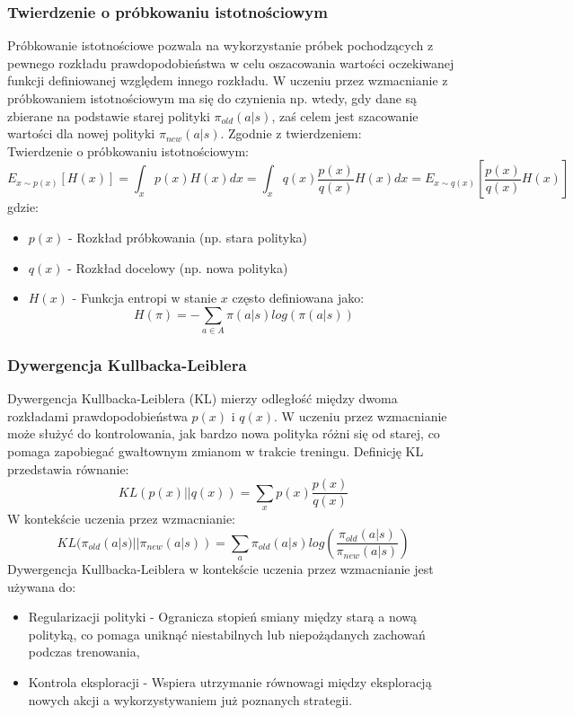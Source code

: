 \documentclass[a4paper, 12pt]{article}
\begin{document}
    \subsubsection{Twierdzenie o próbkowaniu istotnościowym}
    Próbkowanie istotnościowe pozwala na wykorzystanie próbek pochodzących z pewnego rozkładu prawdopodobieństwa w celu oszacowania wartości oczekiwanej funkcji definiowanej względem innego rozkładu. W uczeniu przez wzmacnianie z próbkowaniem istotnościowym ma się do czynienia np. wtedy, gdy dane są zbierane na podstawie starej polityki \( \pi_{old}(a|s) \), zaś celem jest szacowanie wartości dla nowej polityki \( \pi_{new} (a|s) \). Zgodnie z twierdzeniem:
    \\ Twierdzenie o próbkowaniu istotnościowym:
    \[ E_{x \sim p(x)} [H(x)] = \int_{x} p(x)H(x) dx = \int_{x} q(x) \frac{p(x)}{q(x)} H(x) dx = E_{x \sim q(x)} [\frac{p(x)}{q(x)}H(x)]\] 
    gdzie:
    \begin{itemize}
        \item \( p(x) \) - Rozkład próbkowania (np. stara polityka)
        \item \( q(x) \) - Rozkład docelowy (np. nowa polityka)
        \item \( H(x) \) - Funkcja entropi w stanie \( x \) często definiowana jako:
        \[ H(\pi) = - \sum_{a \in A} \pi(a|s)log(\pi(a|s)) \]
    \end{itemize}
    \subsubsection{Dywergencja Kullbacka-Leiblera}
    Dywergencja Kullbacka-Leiblera (KL) mierzy odległość między dwoma rozkładami prawdopodobieństwa \( p(x) \) i \( q(x) \). W uczeniu przez wzmacnianie może służyć do kontrolowania, jak bardzo nowa polityka różni się od starej, co pomaga zapobiegać gwałtownym zmianom w trakcie treningu. Definicję KL przedstawia równanie:
    \[ KL(p(x) || q(x)) = \sum_{x} p(x) \frac{p(x)}{q(x)}\]
    W kontekście uczenia przez wzmacnianie:
    \[ KL(\pi_{old}(a|s) || \pi_{new}(a|s)) = \sum_{a} \pi_{old}(a|s) log(\frac{\pi_{old}(a|s)}{\pi_{new}(a|s)})\]
    Dywergencja Kullbacka-Leiblera w kontekście uczenia przez wzmacnianie jest używana do:
    \begin{itemize}
        \item Regularizacji polityki - Ogranicza stopień smiany między starą a nową polityką, co pomaga uniknąć niestabilnych lub niepożądanych zachowań podczas trenowania,
        \item Kontrola eksploracji - Wspiera utrzymanie równowagi między eksploracją nowych akcji a wykorzystywaniem już poznanych strategii.
    \end{itemize}
\end{document}
